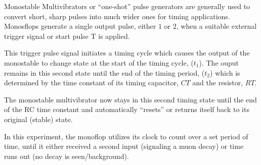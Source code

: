 Monostable Multivibrators or “one-shot” pulse generators are generally used to convert short, sharp pulses into much wider ones for timing applications. Monosflops generate a single output pulse, either $1$ or $2$, when a suitable external trigger signal or start pulse T is applied.

This trigger pulse signal initiates a timing cycle which causes the output of the monostable to change state at the start of the timing cycle, ($t_1$). The ouput remains in this second state until the end of the timing period, ($t_2$) which is determined by the time constant of its timing capacitor, $CT$ and the resistor, $RT$.

The monostable multivibrator now stays in this second timing state until the end of the RC time constant and automatically “resets” or returns itself back to its original (stable) state.

In this experiment, the monoflop utilizes its clock to count over a set period of time, until it either received a second input (signaling a muon decay) or time runs out (no decay is seen/background).



